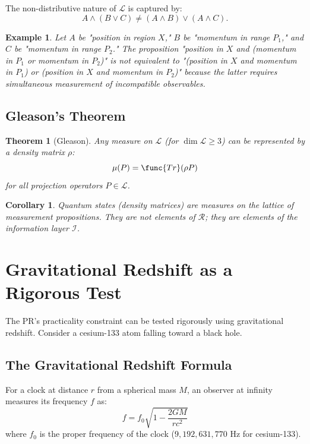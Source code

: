 \documentclass[aps,preprint,showpacs,showkeys]{revtex4}%
\newtheorem{theorem}{Theorem}
\newtheorem{corollary}{Corollary}
\newtheorem{example}{Example}
\begin{document}
The non-distributive nature of $\mathcal{L}$ is captured by: 
\begin{equation}
A \wedge (B \vee C) \neq (A \wedge B) \vee (A \wedge C).
\end{equation}

\begin{example}
Let $A$ be "position in region $X$," $B$ be "momentum in range $P_1$," and $%
C $ be "momentum in range $P_2$." The proposition "position in $X$ and
(momentum in $P_1$ or momentum in $P_2$)" is not equivalent to "(position in 
$X$ and momentum in $P_1$) or (position in $X$ and momentum in $P_2$)"
because the latter requires simultaneous measurement of incompatible
observables.
\end{example}

\subsection{Gleason's Theorem}

\begin{theorem}[Gleason]
Any measure on $\mathcal{L}$ (for $\dim \mathcal{L} \ge 3$) can be
represented by a density matrix $\rho$: 
\begin{equation}
\mu(P) = \func{Tr}(\rho P)
\end{equation}
for all projection operators $P \in \mathcal{L}$.
\end{theorem}

\begin{corollary}
Quantum states (density matrices) are measures on the lattice of measurement
propositions. They are not elements of $\mathcal{R}$; they are elements of
the information layer $\mathcal{I}$.
\end{corollary}

\section{Gravitational Redshift as a Rigorous Test}

The PR's practicality constraint can be tested rigorously using
gravitational redshift. Consider a cesium-133 atom falling toward a black
hole.

\subsection{The Gravitational Redshift Formula}

For a clock at distance $r$ from a spherical mass $M$, an observer at
infinity measures its frequency $f$ as: 
\begin{equation}
f = f_0 \sqrt{1 - \frac{2GM}{rc^2}}
\end{equation}
where $f_0$ is the proper frequency of the clock ($9,192,631,770$ Hz for
cesium-133).
\end{document}
